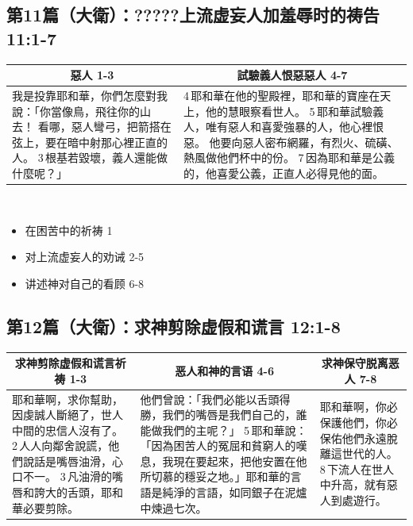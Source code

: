 \subsection{第11篇（大衛）：?????上流虚妄人加羞辱时的祷告  11:1-7}
\begin{table}[H]
\centering
\begin{tabular}{p{4.75cm}|p{12.00cm}}\hline\hline
\multicolumn{1}{c|}{惡人 1-3}&\multicolumn{1}{c|}{試驗義人恨惡惡人 4-7}\\\hline
我是投靠耶和華，你們怎麼對我說：「你當像鳥，飛往你的山去！
看哪，惡人彎弓，把箭搭在弦上，要在暗中射那心裡正直的人。
3 根基若毀壞，義人還能做什麼呢？」
&4 耶和華在他的聖殿裡，耶和華的寶座在天上，他的慧眼察看世人。
5 耶和華試驗義人，唯有惡人和喜愛強暴的人，他心裡恨惡。
他要向惡人密布網羅，有烈火、硫磺、熱風做他們杯中的份。
7 因為耶和華是公義的，他喜愛公義，正直人必得見他的面。\\\hline
\end{tabular}
\end{table} 

\begin{itemize}
\itemsep-.45em  
\item 在困苦中的祈祷  1
\item 对上流虚妄人的劝诫  2-5
\item 讲述神对自己的看顾  6-8
\end{itemize}

\subsection{第12篇（大衛）：求神剪除虚假和谎言  12:1-8}
\begin{table}[H]
\centering
\begin{tabular}{p{4.75cm}|p{7.00cm}|p{4.00cm}}\hline\hline
\multicolumn{1}{c|}{求神剪除虚假和谎言祈祷   1-3}&\multicolumn{1}{c|}{恶人和神的言语  4-6}&\multicolumn{1}{c|}{求神保守脱离恶人  7-8}\\\hline
耶和華啊，求你幫助，因虔誠人斷絕了，世人中間的忠信人沒有了。
2 人人向鄰舍說謊，他們說話是嘴唇油滑，心口不一。
3 凡油滑的嘴唇和誇大的舌頭，耶和華必要剪除。
&他們曾說：「我們必能以舌頭得勝，我們的嘴唇是我們自己的，誰能做我們的主呢？」
5 耶和華說：「因為困苦人的冤屈和貧窮人的嘆息，我現在要起來，把他安置在他所切慕的穩妥之地。」耶和華的言語是純淨的言語，如同銀子在泥爐中煉過七次。
&耶和華啊，你必保護他們，你必保佑他們永遠脫離這世代的人。
8 下流人在世人中升高，就有惡人到處遊行。\\\hline
\end{tabular}
\end{table} 


